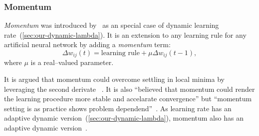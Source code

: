 \subsubsection{Momentum}
\label{sec:our-momentum}

\emph{Momentum} was introduced by~\citet{jacobs1988increased} as an special case of dynamic learning rate~(\ref{sec:our-dynamic-lambda}). It is an extension to any learning rule for any artificial neural network by adding a \emph{momentum} term: 
\begin{equation} 
  \Delta w_{ij}(t) = \mbox{learning rule} + \mu \Delta w_{ij}(t-1), \nonumber
\end{equation} 
where $\mu$ is a real--valued parameter. 

It is argued that momentum could overcome settling in local minima by leveraging the second derivate ~\citep{phansalkar1994analysis}. It is also \enquote{believed that momentum could render the learning procedure more stable and accelarate convergence} but \enquote{momentum setting is as practice shows problem dependend}~\citep{riedmiller1993direct}. As learning rate has an adaptive dynamic version~(\ref{sec:our-dynamic-lambda}), momentum also has an adaptive dynamic version~\citep{miniani1990acceleration}. 
